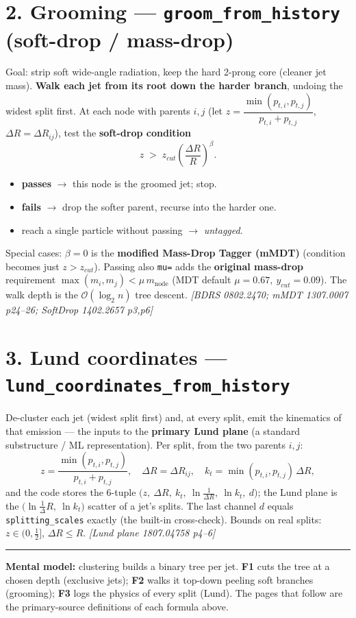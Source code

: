 \documentclass[10pt]{article}
\newcommand{\code}[1]{\texttt{\small #1}}
\newcommand{\dR}{\Delta R}
\begin{document}
\section*{2. Grooming --- \code{groom\_from\_history} (soft-drop / mass-drop)}
Goal: strip soft wide-angle radiation, keep the hard 2-prong core (cleaner jet mass).
\textbf{Walk each jet from its root down the harder branch}, undoing the widest split first. At each node
with parents $i,j$ (let $z=\dfrac{\min(p_{t,i},p_{t,j})}{p_{t,i}+p_{t,j}}$, $\dR=\dR_{ij}$), test the
\textbf{soft-drop condition}
\[
z \;>\; z_{cut}\left(\frac{\dR}{R}\right)^{\!\beta}.
\]
\begin{itemize}[nosep,leftmargin=1.4em]
  \item \textbf{passes} $\to$ this node is the groomed jet; stop.
  \item \textbf{fails} $\to$ drop the softer parent, recurse into the harder one.
  \item reach a single particle without passing $\to$ \emph{untagged}.
\end{itemize}
Special cases: \textbf{$\beta{=}0$} is the \textbf{modified Mass-Drop Tagger (mMDT)}
(condition becomes just $z>z_{cut}$). Passing also \code{mu=} adds the \textbf{original mass-drop}
requirement $\max(m_i,m_j)<\mu\,m_{\text{node}}$ (MDT default $\mu{=}0.67,\ y_{cut}{=}0.09$).
The walk depth is the $\mathcal{O}(\log_2 n)$ tree descent.
\hfill\emph{[BDRS 0802.2470; mMDT 1307.0007 p24--26; SoftDrop 1402.2657 p3,p6]}

\section*{3. Lund coordinates --- \code{lund\_coordinates\_from\_history}}
De-cluster each jet (widest split first) and, at every split, emit the kinematics of that emission ---
the inputs to the \textbf{primary Lund plane} (a standard substructure / ML representation).
Per split, from the two parents $i,j$:
\[
z=\frac{\min(p_{t,i},p_{t,j})}{p_{t,i}+p_{t,j}},\quad \dR=\dR_{ij},\quad k_t=\min(p_{t,i},p_{t,j})\,\dR,
\]
and the code stores the 6-tuple $\big(z,\ \dR,\ k_t,\ \ln\tfrac{1}{\dR},\ \ln k_t,\ d\big)$; the Lund
plane is the $\big(\ln\tfrac1\dR,\ \ln k_t\big)$ scatter of a jet's splits. The last channel $d$ equals
\code{splitting\_scales} exactly (the built-in cross-check). Bounds on real splits: $z\in(0,\tfrac12]$,
$\dR\le R$.
\hfill\emph{[Lund plane 1807.04758 p4--6]}

\vspace{4pt}\hrule\vspace{3pt}
{\small\textbf{Mental model:} clustering builds a binary tree per jet. \textbf{F1} cuts the tree at a
chosen depth (exclusive jets); \textbf{F2} walks it top-down peeling soft branches (grooming);
\textbf{F3} logs the physics of every split (Lund). The pages that follow are the primary-source
definitions of each formula above.}
\end{document}
